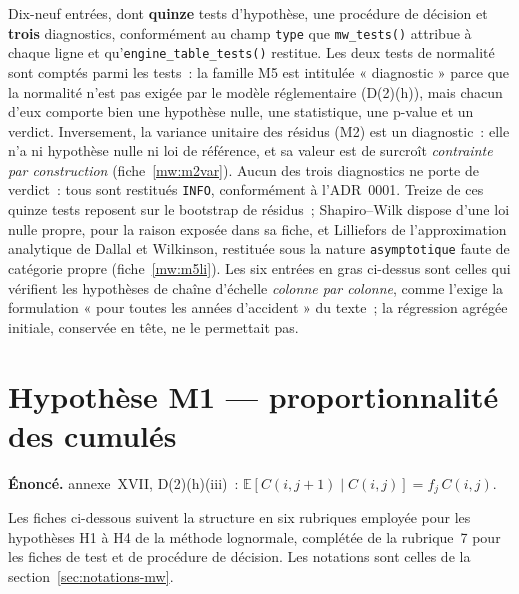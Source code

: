 \documentclass[a4paper,11pt]{article}
\newcommand{\code}[1]{\texttt{\small #1}}
\begin{document}
\noindent
Dix-neuf entrées, dont \textbf{quinze} tests d'hypothèse, une procédure de
décision et \textbf{trois} diagnostics, conformément au champ \code{type} que
\code{mw\_tests()} attribue à chaque ligne et qu'\code{engine\_table\_tests()}
restitue. Les deux tests de normalité sont comptés parmi les tests~: la famille
M5 est intitulée « diagnostic » parce que la normalité n'est pas exigée par le
modèle réglementaire (D(2)(h)), mais chacun d'eux comporte bien une hypothèse
nulle, une statistique, une p-value et un verdict. Inversement, la variance
unitaire des résidus (M2) est un diagnostic~: elle n'a ni hypothèse nulle ni loi
de référence, et sa valeur est de surcroît \emph{contrainte par construction}
(fiche~\ref{mw:m2var}). Aucun des trois diagnostics ne porte de verdict~: tous
sont restitués \code{INFO}, conformément à l'ADR~0001. Treize de ces quinze
tests reposent sur le bootstrap de résidus~; Shapiro--Wilk dispose d'une loi nulle propre, pour la raison exposée
dans sa fiche, et Lilliefors de l'approximation analytique de Dallal et Wilkinson, restituée
sous la nature \code{asymptotique} faute de catégorie propre (fiche~\ref{mw:m5li}). Les six entrées en gras ci-dessus sont celles qui
vérifient les hypothèses de chaîne d'échelle \emph{colonne par colonne}, comme
l'exige la formulation « pour toutes les années d'accident » du texte~; la
régression agrégée initiale, conservée en tête, ne le permettait pas.

\clearpage
\section{Hypothèse M1 --- proportionnalité des cumulés}
\label{sec:mwm1}

\begin{encadre}
\textbf{Énoncé.} annexe~XVII, D(2)(h)(iii)~: $\mathbb{E}[C(i,j+1)\mid C(i,j)] = f_j\,C(i,j)$.
\end{encadre}

Les fiches ci-dessous suivent la structure en six rubriques employée pour les
hypothèses H1 à H4 de la méthode lognormale, complétée de la rubrique~7 pour les
fiches de test et de procédure de décision. Les notations sont celles de la
section~\ref{sec:notations-mw}.
\end{document}
